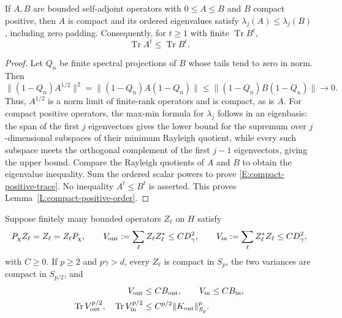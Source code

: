 \begin{lemma}\label{L:compact-positive-order}
  If $A,B$ are bounded self-adjoint operators with $0 \le A \le B$
  and $B$ compact positive, then $A$ is compact and
  its ordered eigenvalues satisfy $\lambda_j(A)\le\lambda_j(B)$, including
  zero padding. Consequently, for $t \ge 1$ with finite $\operatorname{Tr}B^t$,
  \begin{equation}\label{E:compact-positive-trace}
    \operatorname{Tr}A^t\le\operatorname{Tr}B^t.
  \end{equation}
\end{lemma}

\begin{proof}
  Let $Q_n$ be finite spectral projections of $B$ whose tails tend to zero
  in norm. Then
  \[
    \|(1-Q_n)A^{1/2}\|^2
    =\|(1-Q_n)A(1-Q_n)\|
    \le\|(1-Q_n)B(1-Q_n)\|\longrightarrow0.
  \]
  Thus, $A^{1/2}$ is a norm limit of finite-rank operators and is compact,
  as is $A$. For compact positive operators, the max-min formula for
  $\lambda_j$ follows in an eigenbasis: the span of the first $j$
  eigenvectors gives the lower bound for the supremum over $j$-dimensional
  subspaces of their minimum Rayleigh quotient, while every such subspace
  meets the orthogonal complement of the first $j-1$ eigenvectors, giving
  the upper bound. Compare the Rayleigh quotients of $A$ and $B$ to obtain
  the eigenvalue inequality. Sum the ordered scalar powers to prove
  \eqref{E:compact-positive-trace}. No inequality $A^t\le B^t$ is asserted.
  This proves Lemma~\ref{L:compact-positive-order}.
\end{proof}

\begin{proposition}\label{P:localized-finite-variance}
  Suppose finitely many bounded operators $Z_\ell$ on $H$ satisfy
  \begin{equation}\label{E:localized-finite-hypotheses}
    P_\chi Z_\ell=Z_\ell=Z_\ell P_\chi,\qquad
    V_{\rm out}:=\sum_\ell Z_\ell Z_\ell^*\le CD_\gamma^2,\qquad
    V_{\rm in}:=\sum_\ell Z_\ell^*Z_\ell\le CD_\gamma^2,
  \end{equation}
  with $C \ge 0$. If $p \ge 2$ and $p\gamma>d$, every $Z_\ell$ is
  compact in $S_p$, the two variances are compact in $S_{p/2}$, and
  \begin{align}
    V_{\rm out}&\le CB_{\rm out},\qquad V_{\rm in}\le CB_{\rm in},
    \label{E:localized-two-envelopes}\\
    \operatorname{Tr}V_{\rm out}^{p/2},\quad
    \operatorname{Tr}V_{\rm in}^{p/2}
    &\le C^{p/2}\|K_{\rm out}\|_{S_p}^p.
    \label{E:localized-trace-bounds}
  \end{align}
\end{proposition}


